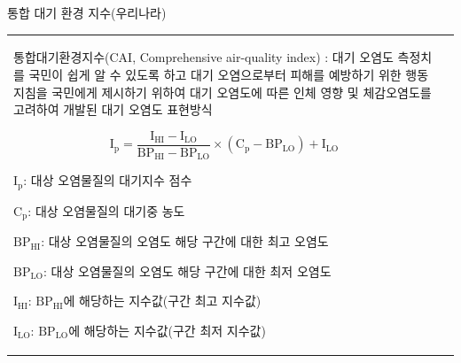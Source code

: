 \begin{frame}[t]{통합 대기 환경 지수(우리나라)}
	\begin{tabular}{ll}
		\begin{minipage}[t]{0.55\textwidth}\scriptsize
			통합대기환경지수(CAI, Comprehensive air-quality index) : 대기 오염도 측정치를 국민이 쉽게 알 수 있도록 하고 대기 오염으로부터 피해를 예방하기 위한 행동지침을 국민에게 제시하기 위하여 대기 오염도에 따른 인체 영향 및 체감오염도를 고려하여 개발된 대기 오염도 표현방식
				
				$$
				\mathrm{I}_{\mathrm{p}}=\frac{\mathrm{I}_{\mathrm{HI}}-\mathrm{I}_{\mathrm{LO}}}{\mathrm{BP}_{\mathrm{HI}}-\mathrm{BP}_{\mathrm{LO}}} \times\left(\mathrm{C}_{\mathrm{p}}-\mathrm{BP}_{\mathrm{LO}}\right)+\mathrm{I}_{\mathrm{LO}}
				$$

				$\mathrm{I}_{\mathrm{p}}$: 대상 오염물질의 대기지수 점수

				$\mathrm{C}_{\mathrm{p}}$: 대상 오염물질의 대기중 농도

				$\mathrm{BP}_{\mathrm{HI}}$: 대상 오염물질의 오염도 해당 구간에 대한 최고 오염도

				$\mathrm{BP}_{\mathrm{LO}}$: 대상 오염물질의 오염도 해당 구간에 대한 최저 오염도

				$\mathrm{I}_{\mathrm{HI}}$: $\mathrm{BP}_{\mathrm{HI}}$에 해당하는 지수값(구간 최고 지수값)

				$\mathrm{I}_{\mathrm{LO}}$: $\mathrm{BP}_{\mathrm{LO}}$에 해당하는 지수값(구간 최저 지수값)
		\end{minipage}	
		&
		\begin{minipage}[t]{0.4\textwidth} \scriptsize	

		\end{minipage}
	\end{tabular}
\end{frame}




